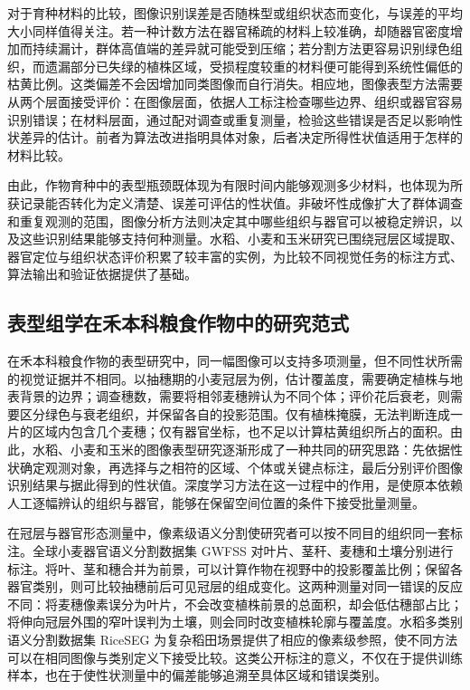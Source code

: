 对于育种材料的比较，图像识别误差是否随株型或组织状态而变化，与误差的平均大小同样值得关注。若一种计数方法在器官稀疏的材料上较准确，却随器官密度增加而持续漏计，群体高值端的差异就可能受到压缩；若分割方法更容易识别绿色组织，而遗漏部分已失绿的植株区域，受损程度较重的材料便可能得到系统性偏低的枯黄比例。这类偏差不会因增加同类图像而自行消失。相应地，图像表型方法需要从两个层面接受评价：在图像层面，依据人工标注检查哪些边界、组织或器官容易识别错误；在材料层面，通过配对调查或重复测量，检验这些错误是否足以影响性状差异的估计。前者为算法改进指明具体对象，后者决定所得性状值适用于怎样的材料比较。

由此，作物育种中的表型瓶颈既体现为有限时间内能够观测多少材料，也体现为所获记录能否转化为定义清楚、误差可评估的性状值。非破坏性成像扩大了群体调查和重复观测的范围，图像分析方法则决定其中哪些组织与器官可以被稳定辨识，以及这些识别结果能够支持何种测量。水稻、小麦和玉米研究已围绕冠层区域提取、器官定位与组织状态评价积累了较丰富的实例，为比较不同视觉任务的标注方式、算法输出和验证依据提供了基础。


\subsection{表型组学在禾本科粮食作物中的研究范式}
\label{sec:cereal-phenomics}

在禾本科粮食作物的表型研究中，同一幅图像可以支持多项测量，但不同性状所需的视觉证据并不相同。以抽穗期的小麦冠层为例，估计覆盖度，需要确定植株与地表背景的边界；调查穗数，需要将相邻麦穗辨认为不同个体；评价花后衰老，则需要区分绿色与衰老组织，并保留各自的投影范围。仅有植株掩膜，无法判断连成一片的区域内包含几个麦穗；仅有器官坐标，也不足以计算枯黄组织所占的面积。由此，水稻、小麦和玉米的图像表型研究逐渐形成了一种共同的研究思路：先依据性状确定观测对象，再选择与之相符的区域、个体或关键点标注，最后分别评价图像识别结果与据此得到的性状值。深度学习方法在这一过程中的作用，是使原本依赖人工逐幅辨认的组织与器官，能够在保留空间位置的条件下接受批量测量。

在冠层与器官形态测量中，像素级语义分割使研究者可以按不同目的组织同一套标注。全球小麦器官语义分割数据集 GWFSS 对叶片、茎秆、麦穗和土壤分别进行标注。将叶、茎和穗合并为前景，可以计算作物在视野中的投影覆盖比例；保留各器官类别，则可比较抽穗前后可见冠层的组成变化。这两种测量对同一错误的反应不同：将麦穗像素误分为叶片，不会改变植株前景的总面积，却会低估穗部占比；将伸向冠层外围的窄叶误判为土壤，则会同时改变植株轮廓与覆盖度。水稻多类别语义分割数据集 RiceSEG 为复杂稻田场景提供了相应的像素级参照，使不同方法可以在相同图像与类别定义下接受比较。这类公开标注的意义，不仅在于提供训练样本，也在于使性状测量中的偏差能够追溯至具体区域和错误类别。

